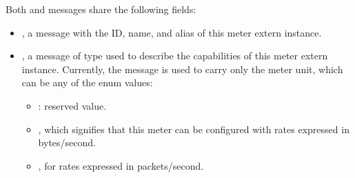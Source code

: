 \documentclass[11pt]{article}
\begin{document}
{%
\noindent{}Both  and  messages share the following fields:%

\begin{itemize}%

\item{}
, a  message with the ID, name, and alias of this meter
extern instance.%

\item{}
, a message of type  used to describe the capabilities of
this meter extern instance. Currently, the  message is used to
carry only the meter unit, which can be any of the  enum
values:%

\begin{itemize}[noitemsep,topsep=\mdcompacttopsep]%

\item{}: reserved value.%

\item{}, which signifies that this meter can be configured with rates
expressed in bytes/second.%

\item{}, for rates expressed in packets/second.%
\end{itemize}%
\end{itemize}%

}
\end{document}
